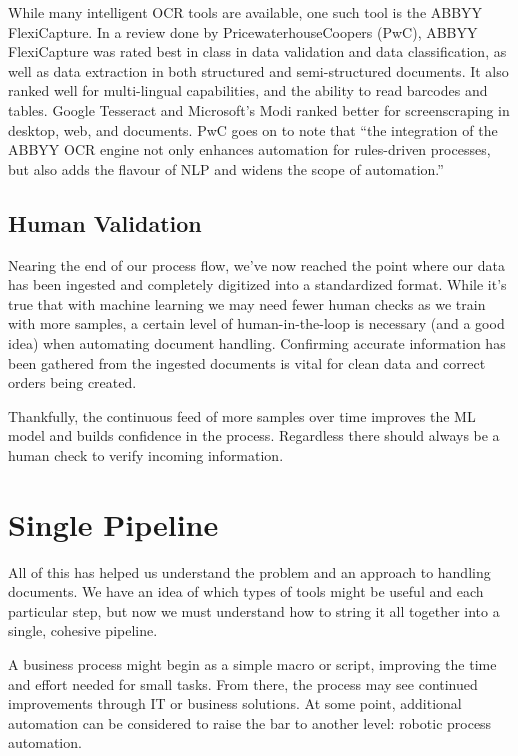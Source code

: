 \documentclass[conference]{IEEEtran}
\begin{document}
While many intelligent OCR tools are available, one such tool is the ABBYY FlexiCapture. In a review done by PricewaterhouseCoopers (PwC), ABBYY FlexiCapture was rated best in class in data validation and data classification, as well as data extraction in both structured and semi-structured documents. It also ranked well for multi-lingual capabilities, and the ability to read barcodes and tables. Google Tesseract and Microsoft's Modi ranked better for screenscraping in desktop, web, and documents. PwC goes on to note that ``the integration of the ABBYY OCR engine not only enhances automation for rules-driven processes, but also adds the flavour of NLP and widens the scope of automation.'' \cite{pwc2018robotic}

\subsection{Human Validation}
Nearing the end of our process flow, we've now reached the point where our data has been ingested and completely digitized into a standardized format. While it's true that with machine learning we may need fewer human checks as we train with more samples, a certain level of human-in-the-loop is necessary (and a good idea) when automating document handling. Confirming accurate information has been gathered from the ingested documents is vital for clean data and correct orders being created.

Thankfully, the continuous feed of more samples over time improves the ML model and builds confidence in the process. Regardless there should always be a human check to verify incoming information.

\section{Single Pipeline} \label{sectionSinglePipeline}
All of this has helped us understand the problem and an approach to handling documents. We have an idea of which types of tools might be useful and each particular step, but now we must understand how to string it all together into a single, cohesive pipeline.

A business process might begin as a simple macro or script, improving the time and effort needed for small tasks. From there, the process may see continued improvements through IT or business solutions. At some point, additional automation can be considered to raise the bar to another level: robotic process automation.
\end{document}
